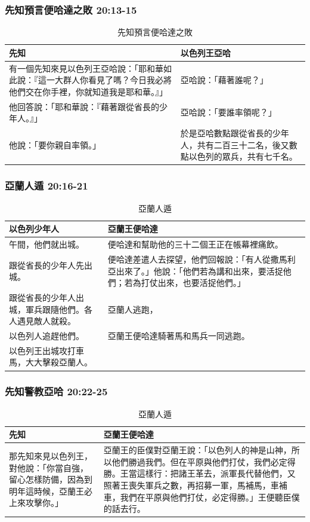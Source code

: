 \subsubsection{先知預言便哈達之敗 20:13-15}
\begin{table}[H]
\centering 
{}
\begin{tabular}{p{}|p{7.65cm}}\hline\hline
先知&以色列王亞哈\\\hline
有一個先知來見以色列王亞哈說：「耶和華如此說：『這一大群人你看見了嗎？今日我必將他們交在你手裡，你就知道我是耶和華。』」
&亞哈說：「藉著誰呢？」\\\hline
他回答說：「耶和華說：『藉著跟從省長的少年人。』」&亞哈說：「要誰率領呢？」\\\hline
他說：「要你親自率領。」 &於是亞哈數點跟從省長的少年人，共有二百三十二名，後又數點以色列的眾兵，共有七千名。\\\hline
\end{tabular}
\caption{先知預言便哈達之敗}
\end{table} 

\subsubsection{亞蘭人遁 20:16-21}
\begin{table}[H]
\centering 
{}
\begin{tabular}{p{9.5cm}|p{7.5cm}}\hline\hline
以色列少年人&亞蘭王便哈達\\\hline
午間，他們就出城。&便哈達和幫助他的三十二個王正在帳幕裡痛飲。\\\hline
跟從省長的少年人先出城。&便哈達差遣人去探望，他們回報說：「有人從撒馬利亞出來了。」他說：「他們若為講和出來，要活捉他們；若為打仗出來，也要活捉他們。」\\\hline
跟從省長的少年人出城，軍兵跟隨他們。各人遇見敵人就殺。&亞蘭人逃跑，\\\hline
以色列人追趕他們。&亞蘭王便哈達騎著馬和馬兵一同逃跑。\\\hline
以色列王出城攻打車馬，大大擊殺亞蘭人。&\\\hline
\end{tabular}
\caption{亞蘭人遁}
\end{table} 


\subsubsection{先知警教亞哈 20:22-25}
\begin{table}[H]
\centering 
{}
\begin{tabular}{p{4.5cm}|p{}}\hline\hline
先知&亞蘭王便哈達\\\hline
那先知來見以色列王，對他說：「你當自強，留心怎樣防備，因為到明年這時候，亞蘭王必上來攻擊你。」&亞蘭王的臣僕對亞蘭王說：「以色列人的神是山神，所以他們勝過我們。但在平原與他們打仗，我們必定得勝。王當這樣行：把諸王革去，派軍長代替他們，又照著王喪失軍兵之數，再招募一軍，馬補馬，車補車，我們在平原與他們打仗，必定得勝。」王便聽臣僕的話去行。\\\hline
\end{tabular}
\caption{亞蘭人遁}
\end{table} 


